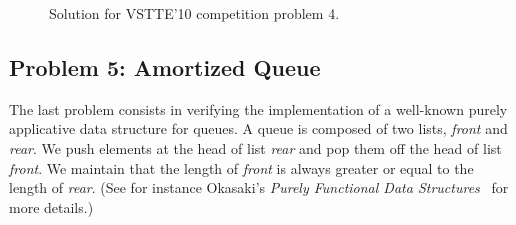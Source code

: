 \begin{figure}
  \centering
\begin{verbatim}
\end{verbatim}
\vspace*{-2em}\hrulefill
  \caption{Solution for VSTTE'10 competition problem 4.}
  \label{fig:NQueens}
\end{figure}

\subsection{Problem 5: Amortized Queue}

The last problem consists in verifying the implementation of a
well-known purely applicative data structure for queues.
A queue is composed of two lists, \textit{front} and \textit{rear}.
We push elements at the head of list \textit{rear} and pop them off
the head of list \textit{front}. We maintain that the length of
\textit{front} is always greater or equal to the length of \textit{rear}.
(See for instance Okasaki's \emph{Purely Functional Data
  Structures}~\cite{okasaki98} for more details.)

